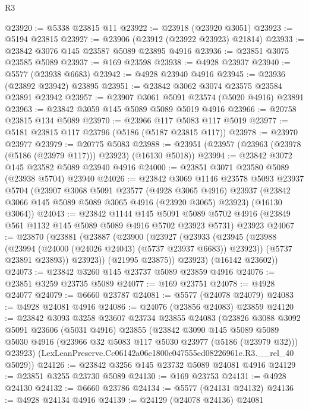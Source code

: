 \begin{lexlean}{R3}
\begin{coremodule}
@23920 := @5338 @23815 @11
@23922 := @23918 (@23920 @3051)
@23923 := @5194 @23815
@23927 := @23906 (@23912 (@23922 @23923) @21814)
@23933 := @23842 @3076 @145 @23587 @5089 @23895 @4916
@23936 := @23851 @3075 @23585 @5089
@23937 := @169 @23598
@23938 := @4928 @23937
@23940 := @5577 (@23938 @6683)
@23942 := @4928 @23940 @4916
@23945 := @23936 (@23892 @23942) @23895
@23951 := @23842 @3062 @3074 @23575 @23584 @23891 @23942
@23957 := @23907 @3061 @5091 @23574 (@5020 @4916) @23891
@23963 := @23842 @3059 @145 @5089 @5089 @5019 @4916
@23966 := @20758 @23815 @134 @5089
@23970 := @23966 @117 @5083 @117 @5019
@23977 := @5181 @23815 @117 @23796 (@5186 (@5187 @23815 @117))
@23978 := @23970 @23977
@23979 := @20775 @5083
@23988 := @23951 (@23957 (@23963 (@23978 (@5186 (@23979 @117))) @23923) (@16130 @5018))
@23994 := @23842 @3072 @145 @23582 @5089 @23940 @4916
@24000 := @23851 @3071 @23580 @5089 (@23938 @5704) @23940
@24026 := @23842
    @3069
    @1146
    @23578
    @5093
    @23937
    @5704
    (@23907
      @3068
      @5091
      @23577
      (@4928 @3065 @4916)
      @23937
      (@23842 @3066 @145 @5089 @5089 @3065 @4916 (@23920 @3065) @23923)
      (@16130 @3064))
@24043 := @23842
    @1144
    @145
    @5091
    @5089
    @5702
    @4916
    (@23849 @561 @1132 @145 @5089 @5089 @4916 @5702 @23923 @5731)
    @23923
@24067 := @23870
    (@23881
      (@23887
        (@23900
          (@23927
            (@23933
              (@23945
                (@23988 (@23994 (@24000 (@24026 @24043) (@5737 @23937 @6683)) @23923))
                (@5737 @23891 @23893))
              @23923))
          (@21995 @23875))
        @23923)
      (@16142 @23602))
@24073 := @23842 @3260 @145 @23737 @5089 @23859 @4916
@24076 := @23851 @3259 @23735 @5089
@24077 := @169 @23751
@24078 := @4928 @24077
@24079 := @6660 @23787
@24081 := @5577 (@24078 @24079)
@24083 := @4928 @24081 @4916
@24086 := @24076 (@23856 @24083) @23859
@24120 := @23842
    @3093
    @3258
    @23607
    @23734
    @23855
    @24083
    (@23826
      @3088
      @3092
      @5091
      @23606
      (@5031 @4916)
      @23855
      (@23842
        @3090
        @145
        @5089
        @5089
        @5030
        @4916
        (@23966 @32 @5083 @117 @5030 @23977 (@5186 (@23979 @32)))
        @23923)
      (LexLeanPreserve.Cc06142a06e1800c047555ed08226961e.R3.__rel_40 @5029))
@24126 := @23842 @3256 @145 @23732 @5089 @24081 @4916
@24129 := @23851 @3255 @23730 @5089
@24130 := @169 @23753
@24131 := @4928 @24130
@24132 := @6660 @23786
@24134 := @5577 (@24131 @24132)
@24136 := @4928 @24134 @4916
@24139 := @24129 (@24078 @24136) @24081

\end{coremodule}
\end{lexlean}
